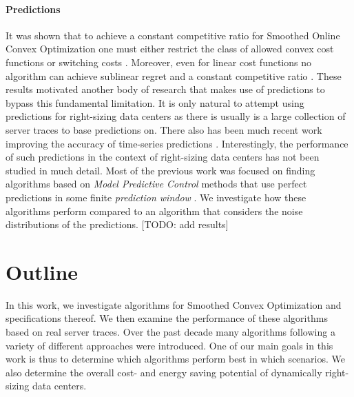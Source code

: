 \paragraph{Predictions} It was shown that to achieve a constant competitive ratio for Smoothed Online Convex Optimization one must either restrict the class of allowed convex cost functions or switching costs \cite{Chen2018}. Moreover, even for linear cost functions no algorithm can achieve sublinear regret and a constant competitive ratio \cite{Andrew2015}. These results motivated another body of research that makes use of predictions to bypass this fundamental limitation. It is only natural to attempt using predictions for right-sizing data centers as there is usually is a large collection of server traces to base predictions on. There also has been much recent work improving the accuracy of time-series predictions \cite{Taylor2017, Benidis2020, Chen2020, Hosseini2021}. Interestingly, the performance of such predictions in the context of right-sizing data centers has not been studied in much detail. Most of the previous work was focused on finding algorithms based on \textit{Model Predictive Control} methods that use perfect predictions in some finite \textit{prediction window} \cite{Lin2012, Chen2015, Badiei2015, Chen2016, Li2018, Lin2019}. We investigate how these algorithms perform compared to an algorithm that considers the noise distributions of the predictions. [TODO: add results]

\section{Outline}

In this work, we investigate algorithms for Smoothed Convex Optimization and specifications thereof. We then examine the performance of these algorithms based on real server traces. Over the past decade many algorithms following a variety of different approaches were introduced. One of our main goals in this work is thus to determine which algorithms perform best in which scenarios. We also determine the overall cost- and energy saving potential of dynamically right-sizing data centers.

